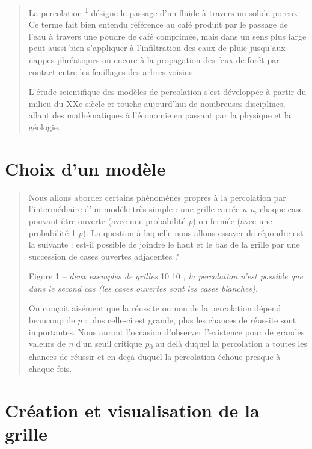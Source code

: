 \documentclass[]{article}
\date{}
\begin{document}
\begin{quote}
La percolation \textsuperscript{1} désigne le passage d'un fluide à
travers un solide poreux. Ce terme fait bien entendu référence au café
produit par le passage de l'eau à travers une poudre de café comprimée,
mais dans un sens plus large peut aussi bien s'appliquer à
l'infiltration des eaux de pluie jusqu'aux nappes phréatiques ou encore
à la propagation des feux de forêt par contact entre les feuillages des
arbres voisins.

L'étude scientifique des modèles de percolation s'est développée à
partir du milieu du XXe siècle et touche aujourd'hui de nombreuses
disciplines, allant des mathématiques à l'économie en passant par la
physique et la géologie.
\end{quote}

\section{Choix d'un modèle}\label{choix-dun-moduxe8le}

\begin{quote}
Nous allons aborder certains phénomènes propres à la percolation par
l'intermédiaire d'un modèle très simple : une grille carrée \emph{n n},
chaque case pouvant être ouverte (avec une probabilité \emph{p}) ou
fermée (avec une probabilité 1 \emph{p}). La question à laquelle nous
allons essayer de répondre est la suivante : est-il possible de joindre
le haut et le bas de la grille par une succession de cases ouvertes
adjacentes ?

Figure 1 -- \emph{deux exemples de grilles} 10 10 \emph{; la percolation
n'est possible que dans le second cas (les cases ouvertes sont les cases
blanches).}

On conçoit aisément que la réussite ou non de la percolation dépend
beaucoup de \emph{p} : plus celle-ci est grande, plus les chances de
réussite sont importantes. Nous auront l'occasion d'observer l'existence
pour de grandes valeurs de \emph{n} d'un seuil critique
\emph{p}\textsubscript{0} au delà duquel la percolation a toutes les
chances de réussir et en deçà duquel la percolation échoue presque à
chaque fois.
\end{quote}

\section{Création et visualisation de la
grille}\label{cruxe9ation-et-visualisation-de-la-grille}
\end{document}
